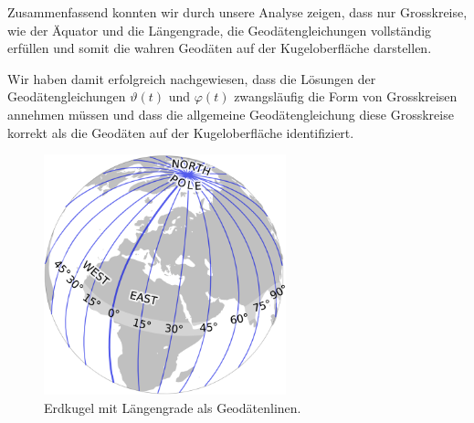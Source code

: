 Zusammenfassend konnten wir durch unsere Analyse zeigen, dass nur Grosskreise, wie der Äquator und die Längengrade, die Geodätengleichungen vollständig erfüllen und somit die wahren Geodäten auf der Kugeloberfläche darstellen.

Wir haben damit erfolgreich nachgewiesen, dass die Lösungen der Geodätengleichungen $\vartheta(t)$ und $\varphi(t)$ zwangsläufig die Form von Grosskreisen annehmen müssen und dass die allgemeine Geodätengleichung diese Grosskreise korrekt als die Geodäten auf der Kugeloberfläche identifiziert.

\begin{figure}
	\centering
	\includegraphics[width=7cm]{papers/geodaeten/Abbildungen/Standardverfahren/StaKugelLaengengrade}
	\caption{Erdkugel mit Längengrade als Geodätenlinen.}
	\label{geodaeten:figure:Standardverfahren:Laengengrade}
\end{figure}
